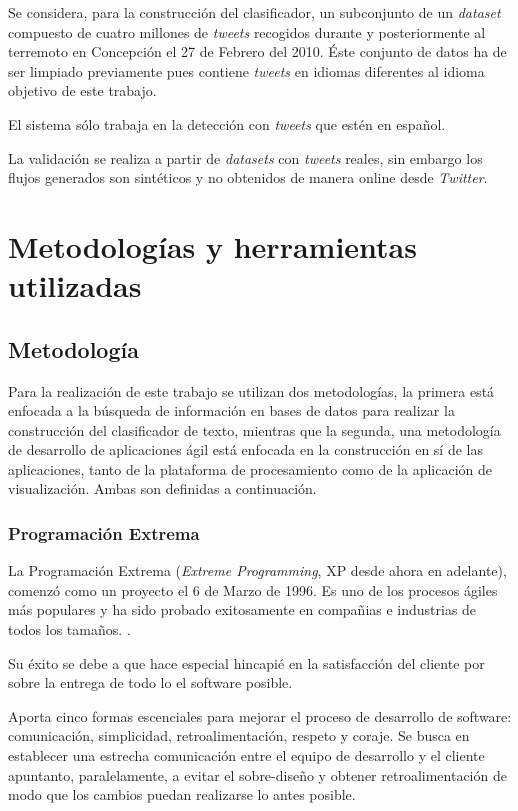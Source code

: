 Se considera, para la construcción del clasificador, un subconjunto de un \textit{dataset} compuesto de cuatro millones de \textit{tweets} recogidos durante y posteriormente al terremoto en Concepción el 27 de Febrero del 2010. Éste conjunto de datos ha de ser limpiado previamente pues contiene \textit{tweets} en idiomas diferentes al idioma objetivo de este trabajo.

El sistema sólo trabaja en la detección con \textit{tweets} que estén en español.

La validación se realiza a partir de \textit{datasets} con \textit{tweets} reales, sin embargo los flujos generados son sintéticos y no obtenidos de manera online desde \textit{Twitter}.

\section{Metodologías y herramientas utilizadas}
\label{intro:metodologia}

\subsection{Metodología}
\label{subsec:MetodologiaDetalle}

Para la realización de este trabajo se utilizan dos metodologías, la primera está enfocada a la búsqueda de información en bases de datos para realizar la construcción del clasificador de texto, mientras que la segunda, una metodología de desarrollo de aplicaciones ágil está enfocada en la construcción en sí de las aplicaciones, tanto de la plataforma de procesamiento como de la aplicación de visualización. Ambas son definidas a continuación.

\subsubsection*{Programación Extrema}
\label{subsubsec:XP}

La Programación Extrema (\textit{Extreme Programming}, XP desde ahora en adelante), comenzó como un proyecto el 6 de Marzo de 1996. Es uno de los procesos ágiles más populares y ha sido probado exitosamente en compañias e industrias de todos los tamaños. \cite{XP}.

Su éxito se debe a que hace especial hincapié en la satisfacción del cliente por sobre la entrega de todo lo el software posible.

Aporta cinco formas escenciales para mejorar el proceso de desarrollo de software: comunicación, simplicidad, retroalimentación, respeto y coraje. Se busca en establecer una estrecha comunicación entre el equipo de desarrollo y el cliente apuntanto, paralelamente, a evitar el sobre-diseño y obtener retroalimentación de modo que los cambios puedan realizarse lo antes posible. 

